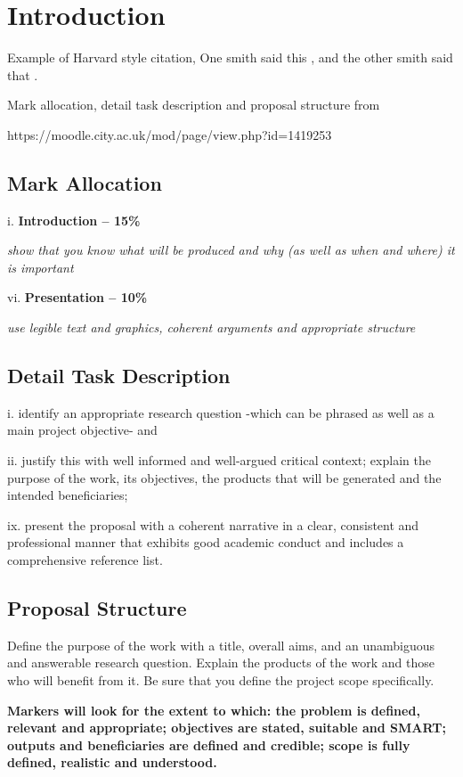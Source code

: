 \section{Introduction}

Example of Harvard style citation, One smith said this \parencite{Smith:2013jd}, and the other smith said that \parencite{Smith:2012qr}.

Mark allocation, detail task description and proposal structure from

https://moodle.city.ac.uk/mod/page/view.php?id=1419253
\subsection{Mark Allocation}

i. \textbf{Introduction -- 15\%}

\textit{show that you know what will be produced and why (as well as when and where) it is important}

vi. \textbf{Presentation -- 10\%}

\textit{use legible text and graphics, coherent arguments and appropriate structure}

\subsection{Detail Task Description}

i. identify an appropriate research question -which can be phrased as well as a main project objective- and

ii. justify this with well informed and well-argued critical context;
explain the purpose of the work, its objectives, the products that will be generated and the intended beneficiaries;

ix. present the proposal with a coherent narrative in a clear, consistent and professional manner that exhibits good academic conduct and includes a comprehensive reference list. 

\subsection{Proposal Structure} 

Define the purpose of the work with a title, overall aims, and an unambiguous and answerable research question. Explain the products of the work and those who will benefit from it. Be sure that you define the project scope specifically.

\textbf{Markers will look for the extent to which: the problem is defined, relevant and appropriate; objectives are stated, suitable and SMART; outputs and beneficiaries are defined and credible; scope is fully defined, realistic and understood.}

